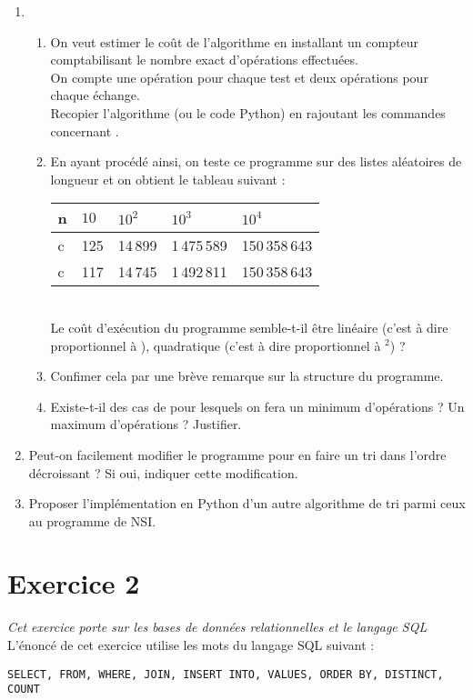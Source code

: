 \documentclass[11pt,a4paper,french,twoside]{PMCours}
\begin{document}
\begin{enumerate}
\item 
\begin{enumerate}
\item On veut estimer le coût de l'algorithme en installant un compteur  comptabilisant le nombre exact d'opérations effectuées. \\
On compte une opération pour chaque test et deux opérations pour chaque échange.\\
Recopier l'algorithme (ou le code Python) en rajoutant les commandes concernant .
\item En ayant procédé ainsi, on teste ce programme sur des listes aléatoires de longueur  et on obtient le tableau suivant :\medskip\\
\begin{tabular}{|p{2cm}|p{2cm}|p{2cm}|p{2cm}|p{2.5cm}|}\hline
n&$10$&$10^2$&$10^3$&$10^4$\\ \hline
c&125&14\,899&1\,475\,589&150\,358\,643\\ \hline
c&117&14\,745&1\,492\,811&150\,358\,643\\ \hline
\end{tabular}\medskip\\
Le coût d'exécution du programme semble-t-il être linéaire (c'est à dire proportionnel à ), quadratique (c'est à dire proportionnel à $^2$) ?
\item Confimer cela par une brève remarque sur la structure du programme. 
\item Existe-t-il des cas de  pour lesquels on fera un minimum d'opérations ? Un maximum d'opérations ? Justifier.
\end{enumerate} 
\item Peut-on facilement modifier le programme pour en faire un tri dans l'ordre décroissant ? Si oui, indiquer cette modification.
\item Proposer l'implémentation en Python d'un autre algorithme de tri parmi ceux au programme de NSI.  
\end{enumerate} 

\newpage\noindent

\section*{Exercice 2}
\emph{Cet exercice porte sur les bases de données relationnelles et le langage SQL}\medskip\\

L'énoncé de cet exercice utilise les mots du langage SQL suivant :
\begin{verbatim}
SELECT, FROM, WHERE, JOIN, INSERT INTO, VALUES, ORDER BY, DISTINCT, COUNT
\end{verbatim}
\end{document}
